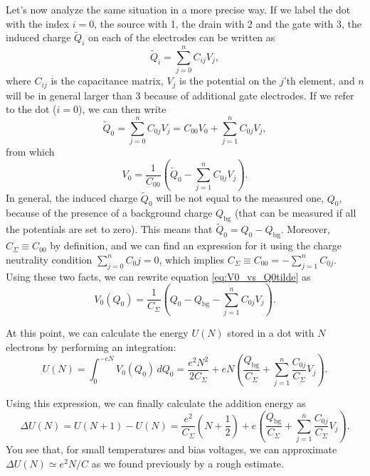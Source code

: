 \documentclass[a4paper,twoside,11pt]{book}
\begin{document}
Let's now analyze the same situation in a more precise way. If we label the dot with the index $i=0$, the source with 1, the drain with 2 and the gate with 3, the induced charge $\tilde{Q}_i$ on each of the electrodes can be written as
\begin{equation}
	\tilde{Q}_i = \sum_{j=0}^{n}C_{ij}V_j,
\end{equation}
where $C_{ij}$ is the capacitance matrix, $V_j$ is the potential on the $j$'th element, and $n$ will be in general larger than 3 because of additional gate electrodes. If we refer to the dot ($i=0$), we can then write
\begin{equation}
	\tilde{Q}_0 = \sum_{j=0}^{n}C_{0j}V_j = C_{00}V_0 + \sum_{j=1}^{n}C_{0j}V_j,
\end{equation}
from which
\begin{equation}
	V_0 = \frac{1}{C_{00}}\left(\tilde{Q}_0 - \sum_{j=1}^{n}C_{0j}V_j\right).
	\label{eq:V0_vs_Q0tilde}
\end{equation}
In general, the induced charge $\tilde{Q}_0$ will be not equal to the measured one, $Q_0$, because of the presence of a background charge $Q_{\text{bg}}$ (that can be measured if all the potentials are set to zero). This means that $\tilde{Q}_0 = Q_0 - Q_{\text{bg}}$. Moreover, $C_{\Sigma} \equiv C_{00}$ by definition, and we can find an expression for it using the charge neutrality condition $\sum_{j=0}^{n}C_0j=0$, which implies $C_{\Sigma} \equiv C_{00} = -\sum_{j=1}^{n}C_{0j}$. Using these two facts, we can rewrite equation \eqref{eq:V0_vs_Q0tilde} as
\begin{equation}
	V_0(Q_0) = \frac{1}{C_{\Sigma}}\left(Q_0 - Q_{\text{bg}} - \sum_{j=1}^{n}C_{0j}V_j\right).
	\label{eq:V0_vs_Q0}
\end{equation}

At this point, we can calculate the energy $U(N)$ stored in a dot with $N$ electrons by performing an integration:
\begin{equation}
	U(N) = \int_{0}^{-eN}V_0(Q_0)\,dQ_0 = \frac{e^2N^2}{2C_{\Sigma}} + eN\left( \frac{Q_{\text{bg}}}{C_{\Sigma}} + \sum_{j=1}^{n}\frac{C_{0j}}{C_{\Sigma}}V_j \right).
\end{equation}

Using this expression, we can finally calculate the addition energy as
\begin{equation}
	\Delta U (N) = U(N+1)-U(N) = \frac{e^2}{C_{\Sigma}}\left(N+\frac{1}{2}\right) + e\left( \frac{Q_{\text{bg}}}{C_{\Sigma}} + \sum_{j=1}^{n}\frac{C_{0j}}{C_{\Sigma}}V_j \right).
\end{equation}
You see that, for small temperatures and bias voltages, we can approximate $\Delta U (N) \simeq e^2N/C$ as we found previously by a rough estimate.
\end{document}
